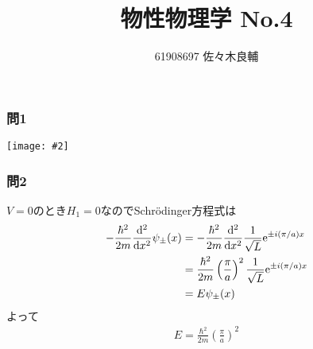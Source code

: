 \documentclass[uplatex,a4j,11pt,dvipdfmx]{jsarticle}
\makeatletter
\def\fgcaption{\def\@captype{figure}\caption}
\newcommand{\mfig}[3][width=15cm]{
\begin{center}
\texttt{[image: \#2]}
\fgcaption{#3 \label{fig:#2}}
\end{center}
}
\makeatother
\begin{document}
\title{物性物理学 No.4}
\author{61908697 佐々木良輔}
\date{}
\maketitle
\subsubsection*{問1}
\mfig[width=6cm]{fig/fig1.png}{$H_1$のグラフ}
\subsubsection*{問2}
$V=0$のとき$H_1=0$なのでSchr\"{o}dinger方程式は
\begin{align}
  \begin{split}
    -\frac{\hbar^2}{2m}\frac{{\rm d}^2}{{\rm d}x^2}\psi_{\pm}(x)&=-\frac{\hbar^2}{2m}\frac{{\rm d}^2}{{\rm d}x^2}\frac{1}{\sqrt{L}}{\rm e}^{\pm i(\pi/a)x}\\
    &=\frac{\hbar^2}{2m}\left(\frac{\pi}{a}\right)^2\frac{1}{\sqrt{L}}{\rm e}^{\pm i(\pi/a)x}\\
    &=E\psi_{\pm}(x)
  \end{split}
\end{align}
よって
\begin{align}
  E=\frac{\hbar^2}{2m}\left(\frac{\pi}{a}\right)^2
\end{align}
\newpage
\end{document}
